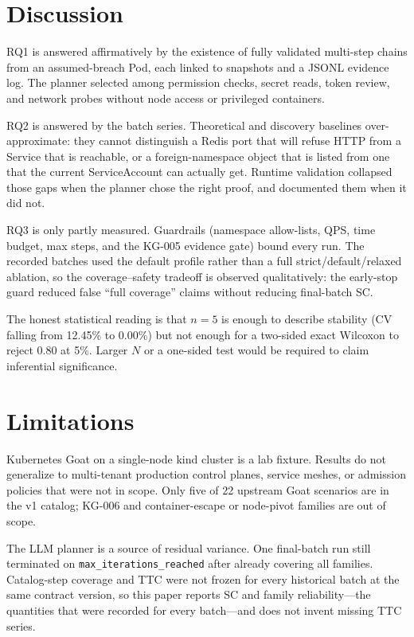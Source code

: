 \documentclass[conference]{IEEEtran}
\begin{document}
\section{Discussion}

RQ1 is answered affirmatively by the existence of fully validated multi-step chains from an assumed-breach Pod, each linked to snapshots and a JSONL evidence log. The planner selected among permission checks, secret reads, token review, and network probes without node access or privileged containers.

RQ2 is answered by the batch series. Theoretical and discovery baselines over-approximate: they cannot distinguish a Redis port that will refuse HTTP from a Service that is reachable, or a foreign-namespace object that is listed from one that the current ServiceAccount can actually get. Runtime validation collapsed those gaps when the planner chose the right proof, and documented them when it did not.

RQ3 is only partly measured. Guardrails (namespace allow-lists, QPS, time budget, max steps, and the KG-005 evidence gate) bound every run. The recorded batches used the default profile rather than a full strict/default/relaxed ablation, so the coverage--safety tradeoff is observed qualitatively: the early-stop guard reduced false ``full coverage'' claims without reducing final-batch SC.

The honest statistical reading is that $n=5$ is enough to describe stability (CV falling from 12.45\% to 0.00\%) but not enough for a two-sided exact Wilcoxon to reject 0.80 at 5\%. Larger $N$ or a one-sided test would be required to claim inferential significance.

\section{Limitations}

Kubernetes Goat on a single-node kind cluster is a lab fixture. Results do not generalize to multi-tenant production control planes, service meshes, or admission policies that were not in scope. Only five of 22 upstream Goat scenarios are in the v1 catalog; KG-006 and container-escape or node-pivot families are out of scope.

The LLM planner is a source of residual variance. One final-batch run still terminated on \texttt{max\_iterations\_reached} after already covering all families. Catalog-step coverage and TTC were not frozen for every historical batch at the same contract version, so this paper reports SC and family reliability---the quantities that were recorded for every batch---and does not invent missing TTC series.
\end{document}
